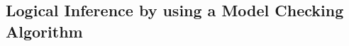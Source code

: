 %
%





\subsection{Logical Inference by using a Model Checking Algorithm}
\label{subsec:Inference_Model_Checking}

